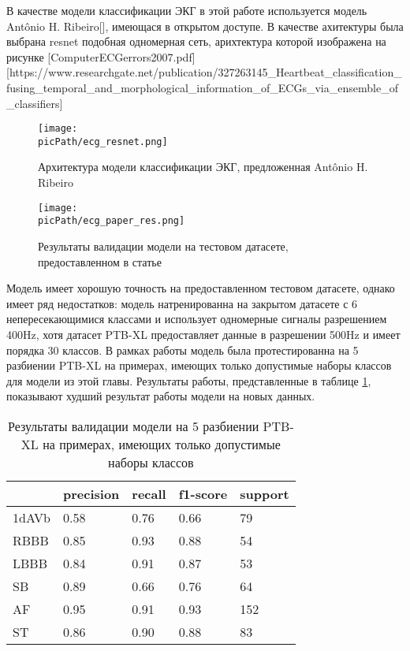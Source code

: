\documentclass[oneside,final,14pt]{extreport}
\newcommand{\picPath}{img}
\begin{document}
В качестве модели классификации ЭКГ в этой работе используется модель Antônio H. Ribeiro[], имеющася в открытом доступе. В качестве ахитектуры была выбрана resnet  подобная одномерная сеть, арихтектура которой изображена на рисунке 
[ComputerECGerrors2007.pdf]
[https://www.researchgate.net/publication/327263145_Heartbeat_classification_fusing_temporal_and_morphological_information_of_ECGs_via_ensemble_of_classifiers]


\begin{figure}[H]
\begin{center}
\texttt{[image: \\picPath/ecg\_resnet.png]}
\end{center}
  \caption{Архитектура модели классификации ЭКГ, предложенная  Antônio H. Ribeiro}
  \label{pic:ecg_resnet}
\end{figure}

\begin{figure}[H]
\begin{center}
\texttt{[image: \\picPath/ecg\_paper\_res.png]}
\end{center}
  \caption{Результаты валидации модели на тестовом датасете, предоставленном в статье}
  \label{pic:ecg_paper_res}
\end{figure}

Модель имеет хорошую точность на предоставленном тестовом датасете, однако имеет ряд недостатков: модель натренированна на закрытом датасете с 6 непересекающимися классами и использует одномерные сигналы разрешением 400Hz, хотя датасет  PTB-XL предоставляет данные в разрешении 500Hz и имеет порядка 30 классов. В рамках работы модель была протестированна на 5 разбиении PTB-XL на примерах, имеющих только допустимые наборы классов для модели из этой главы. Результаты работы, представленные в таблице \ref{tab:ecg_results}, показывают худший результат работы модели на новых данных.
\begin{table}[H]
\caption{Результаты валидации модели на  5 разбиении PTB-XL на примерах, имеющих только допустимые наборы классов}

\label{tab:ecg_results}
\begin{tabularx}{\textwidth}{|X|X|X|X|X|} %
\hline 
&precision & recall &  f1-score  &support \\ \hline
1dAVb   &    0.58   &   0.76  &    0.66  &      79 \\ \hline 
    RBBB   &     0.85   &    0.93   &    0.88  &       54 \\ \hline 
    LBBB   &    0.84   &   0.91   &   0.87   &     53 \\ \hline
      SB  &     0.89   &   0.66  &    0.76  &      64 \\ \hline
      AF    &   0.95  &    0.91  &    0.93   &    152 \\ \hline
      ST  &     0.86  &    0.90   &   0.88   & 83   \\ \hline
\end{tabularx}
\end{table}
\end{document}
